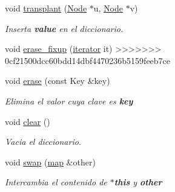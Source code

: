 \begin{Indent}
\begin{DoxyCompactItemize}
void \hyperlink{classaed2_1_1map_a98b9f200c64ce02dfb67902ee00e375a_a98b9f200c64ce02dfb67902ee00e375a}{transplant} (\hyperlink{structaed2_1_1map_1_1Node}{Node} $\ast$u, \hyperlink{structaed2_1_1map_1_1Node}{Node} $\ast$v)
\begin{DoxyCompactList}\small\item\em Inserta {\bfseries value} en el diccionario. \end{DoxyCompactList}\item 
void \hyperlink{classaed2_1_1map_a7870c8f26e82b00d0aeb2e9f331dfec6_a7870c8f26e82b00d0aeb2e9f331dfec6}{erase\+\_\+fixup} (\hyperlink{classaed2_1_1map_1_1iterator}{iterator} it)
>>>>>>> 0cf21500dcc60bdd14dbf4470236b5159feeb7ce
\item 
void \hyperlink{classaed2_1_1map_a2ffadb42cd5f0bc7b3752ff159b75334_a2ffadb42cd5f0bc7b3752ff159b75334}{erase} (const Key \&key)
\begin{DoxyCompactList}\small\item\em Elimina el valor cuya clave es {\bfseries key} \end{DoxyCompactList}\item 
void \hyperlink{classaed2_1_1map_a2bfa5165825979bf2431db55bc6bc9ca_a2bfa5165825979bf2431db55bc6bc9ca}{clear} ()
\begin{DoxyCompactList}\small\item\em Vacia el diccionario. \end{DoxyCompactList}\item 
void \hyperlink{classaed2_1_1map_a43ddb71cc91e5c6021a7a1f243d6cc4a_a43ddb71cc91e5c6021a7a1f243d6cc4a}{swap} (\hyperlink{classaed2_1_1map}{map} \&other)
\begin{DoxyCompactList}\small\item\em Intercambia el contenido de {\bfseries $\ast$this} y {\bfseries other} \end{DoxyCompactList}\end{DoxyCompactItemize}
\end{Indent}
